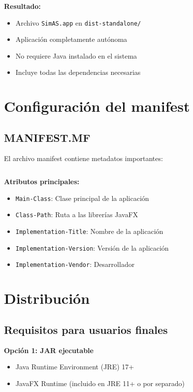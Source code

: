 \textbf{Resultado:}
\begin{itemize}
    \item Archivo \texttt{SimAS.app} en \texttt{dist-standalone/}
    \item Aplicación completamente autónoma
    \item No requiere Java instalado en el sistema
    \item Incluye todas las dependencias necesarias
\end{itemize}

\section{Configuración del manifest}

\subsection{MANIFEST.MF}

El archivo manifest contiene metadatos importantes:

\inputminted[linenos,breaklines]{properties}{codigo/build/MANIFEST.MF}

\textbf{Atributos principales:}

\begin{itemize}
    \item \texttt{Main-Class}: Clase principal de la aplicación
    \item \texttt{Class-Path}: Ruta a las librerías JavaFX
    \item \texttt{Implementation-Title}: Nombre de la aplicación
    \item \texttt{Implementation-Version}: Versión de la aplicación
    \item \texttt{Implementation-Vendor}: Desarrollador
\end{itemize}

\section{Distribución}

\subsection{Requisitos para usuarios finales}

\textbf{Opción 1: JAR ejecutable}
\begin{itemize}
    \item Java Runtime Environment (JRE) 17+
    \item JavaFX Runtime (incluido en JRE 11+ o por separado)
\end{itemize}

